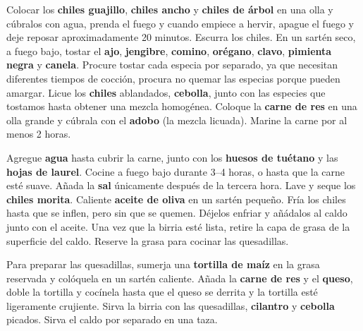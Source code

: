 \vspace{-0.5cm}


Colocar los \textbf{chiles guajillo}, \textbf{chiles ancho} y \textbf{chiles de árbol} en una olla y cúbralos con agua, prenda el fuego y cuando empiece a hervir, apague el fuego y deje reposar aproximadamente 20 minutos. 
Escurra los chiles.
En un sartén seco, a fuego bajo, tostar el \textbf{ajo}, \textbf{jengibre}, \textbf{comino}, \textbf{orégano}, \textbf{clavo}, \textbf{pimienta negra} y \textbf{canela}. 
Procure tostar cada especia por separado, ya que necesitan diferentes tiempos de cocción, procura no quemar las especias porque pueden amargar.
Licue los \textbf{chiles} ablandados, \textbf{cebolla}, junto con las especies que tostamos hasta obtener una mezcla homogénea.
Coloque la \textbf{carne de res} en una olla grande y cúbrala con el \textbf{adobo} (la mezcla licuada). Marine la carne por al menos 2 horas.

Agregue \textbf{agua} hasta cubrir la carne, junto con los \textbf{huesos de tuétano} y las \textbf{hojas de laurel}. 
Cocine a fuego bajo durante 3--4 horas, o hasta que la carne esté suave. Añada la \textbf{sal} únicamente después de la tercera hora.
Lave y seque los \textbf{chiles morita}. 
Caliente \textbf{aceite de oliva} en un sartén pequeño. Fría los chiles hasta que se inflen, pero sin que se quemen. 
Déjelos enfriar y añádalos al caldo junto con el aceite.
Una vez que la birria esté lista, retire la capa de grasa de la superficie del caldo. Reserve la grasa para cocinar las quesadillas.

Para preparar las quesadillas, sumerja una \textbf{tortilla de maíz} en la grasa reservada y colóquela en un sartén caliente. 
Añada la \textbf{carne de res} y el \textbf{queso}, doble la tortilla y cocínela hasta que el queso se derrita y la tortilla esté ligeramente crujiente.
Sirva la birria con las quesadillas, \textbf{cilantro} y \textbf{cebolla} picados. Sirva el caldo por separado en una taza.


\medskip
